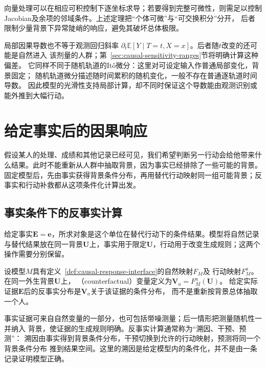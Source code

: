 向量处理可以在相应可积控制下逐坐标求导；若要得到完整可微性，则需足以控制
Jacobian及余项的邻域条件。上述定理把“个体可微”与“可交换积分”分开，
后者限制少量背景下异常陡峭的响应，避免其破坏总体极限。

局部因果导数也不等于观测回归斜率
\(\partial_t\mathbb E[Y\mid T=t,X=x]\)。后者随\(t\)改变的还可能是自然进入
该剂量的人群；第~\ref{sec:causal-sensitivity-ranges}节将明确计算这种偏差。
它同样不同于随机轨道的It\^o微分：这里对可设定输入作普通局部变化，背景固定；
随机轨道微分描述随时间累积的随机变化，一般不存在普通逐轨道时间导数。
因此模型的光滑性支持局部计算，却不同时保证这个导数能由观测识别或能外推到大幅行动。

\section{给定事实后的因果响应}
\label{sec:causal-counterfactual-recourse}

假设某人的处理、成绩和其他记录已经可见，我们希望判断另一行动会给他带来什么结果。此时不能重新从人群中抽取背景，因为事实已经排除了一些可能的背景。固定模型后，先由事实获得背景条件分布，再用替代行动映射同一组可能背景；反事实和行动补救都从这项条件化计算出发。

\subsection{事实条件下的反事实计算}
\label{sec:causal-factual-counterfactual}

给定事实\(\bm E=\bm e\)，所求对象是这个单位在替代行动下的条件结果。模型将自然记录与替代结果放在同一背景\(\bm U\)上，事实用于限定\(\bm U\)，行动用于改变生成规则；这两个操作需要分别保留。

\begin{definition}[给定响应模型的反事实变量]
  \label{def:causal-counterfactual}
  设模型\(M\)具有定义~\ref{def:causal-response-interface}的自然映射\(F_M\)及
  行动映射\(F_M^a\)。在同一外生背景\(\bm U\)上，
  （counterfactual）变量定义为\(\bm V_a=F_M^a(\bm U)\)。
  给定实际证据\(\bm E\)后的反事实分布是\(\bm V_a\)关于该证据的条件分布，
  而不是重新按背景总体抽取一个人。
\end{definition}

事实证据可来自自然变量的一部分，也可包括带噪测量；后一情形把测量随机性一并纳入
背景，使证据的生成规则明确。反事实计算通常称为“溯因、干预、预测”：
溯因由事实得到背景条件分布，干预切换到允许的行动映射，预测将同一个背景条件分布
推到结果空间。这里的溯因是给定模型内的条件化，并不是由一条记录证明模型正确。

